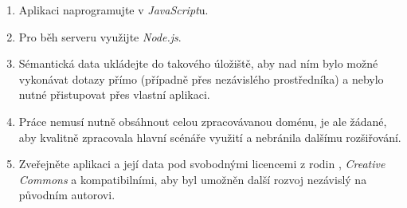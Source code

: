 \begin{enumerate}
 \item Aplikaci naprogramujte v \emph{JavaScript}u.
 \item Pro běh serveru využijte \emph{Node.js}.
 \item Sémantická data ukládejte do takového úložiště, aby nad ním bylo možné vykonávat dotazy přímo (případně přes nezávislého prostředníka) a nebylo nutné přistupovat přes vlastní aplikaci.
 \item Práce nemusí nutně obsáhnout celou zpracovávanou doménu, je ale žádané, aby kvalitně zpracovala hlavní scénáře využití a nebránila dalšímu rozšiřování.
 \item Zveřejněte aplikaci a její data pod svobodnými licencemi z rodin \emph{}, \emph{Creative Commons} a kompatibilními, aby byl umožněn další rozvoj nezávislý na původním autorovi.
\end{enumerate}


